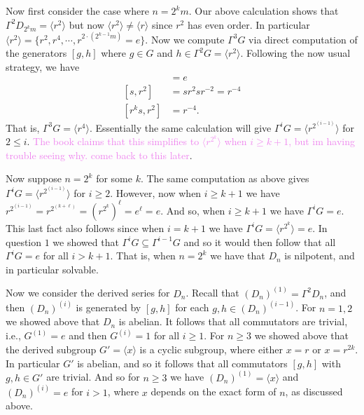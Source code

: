 \documentclass[12pt,letterpaper,boxed]{hmcpset}
\newcommand{\wg}[1]{\textcolor{violet}{#1}}
\newcommand{\anglee}[1]{\langle #1 \rangle}
\begin{document}
\begin{solution}
Now first consider the case where $n = 2^km$. Our above calculation
shows that $\Gamma^{2}D_{2^km} = \anglee{r^2}$ but now $\anglee{r^2}
\neq \anglee r$ since $r^2$ has even order. In particular
$\anglee{r^2} = \{r^2, r^4, \cdots, r^{2\cdot(2^{k-1}m)} = e\}$. 
Now we compute $\Gamma^3 G$ via direct computation of the generators
$[g,h]$ where $g \in G$ and $h \in \Gamma^2G = \anglee{r^2}$.
Following the now usual strategy, we have 
\begin{align*}
	[r^k, r^2] &= e \\
	[s, r^2] &= sr^2 s r^{-2} = r^{-4} \\
	[r^ks, r^2] &= r^{-4}.
\end{align*}
That is, $\Gamma^3 G = \anglee{r^4}$. Essentially the same calculation
will give $\Gamma^i G = \anglee{r^{2^{(i-1)}}}$ for $2 \leq i$.
\wg{The book claims that this simplifies to $\anglee{r^{2^k}}$ when
$i \geq k+1$, but im having trouble seeing why. come back to this
later}.

Now suppose $n = 2^k$ for some $k$. The same computation as above
gives $\Gamma^i G = \anglee{r^{2^(i-1)}}$ for $i \geq 2$. However, now
when $i \geq k+1$ we have $r^{2^(i-1)} = r^{2^(k+\ell)} =
(r^{2^k})^\ell = e^\ell = e$. And so, when $i \geq k+1$ we have 
$\Gamma^i G = e$. This last fact also follows since when $i = k+1$ we
have $\Gamma^i G = \anglee{r^{2^k}} = e$. In question $1$ we showed
that $\Gamma^i G \subseteq \Gamma^{i-1}G$ and so it would then follow
that all $\Gamma^i G = e$ for all $i > k+1$.
That is, when $n = 2^k$ we have that $D_n$ is nilpotent, and in particular solvable. 

Now we consider the derived series for $D_n$. Recall that $(D_n)^{(1)}
= \Gamma^2 D_n$, and then $(D_n)^{(i)}$ is generated by $[g,h]$ for
each $g, h \in (D_n)^{(i-1)}$. For $n=1,2$ we showed above that $D_n$
is abelian. It follows that all commutators are trivial, i.e.,
$G^{(1)} = e$ and then $G^{(i)} = 1$ for all $i \geq 1$.
For $n \geq 3$ we showed above that the derived subgroup $G' = \anglee
x$ is a cyclic subgroup, where either $x = r$ or $x = r^{2k}$.
In particular $G'$ is abelian, and so it follows that all commutators
$[g,h]$ with $g, h \in G'$ are trivial. And so for $n \geq 3$ we have
$(D_n)^{(1)} = \anglee{x}$ and $(D_n)^{(i)} = e$ for $i > 1$, where
$x$ depends on the exact form of $n$, as discussed above.

\end{solution}

\newpage

\end{document}
